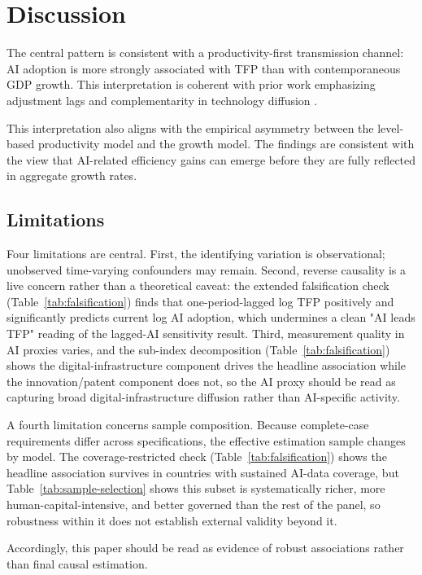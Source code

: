 \section{Discussion}

The central pattern is consistent with a productivity-first transmission channel: AI adoption is more strongly associated with TFP than with contemporaneous GDP growth. This interpretation is coherent with prior work emphasizing adjustment lags and complementarity in technology diffusion \cite{brynjolfssonRockSyverson2019}.

This interpretation also aligns with the empirical asymmetry between the level-based productivity model and the growth model. The findings are consistent with the view that AI-related efficiency gains can emerge before they are fully reflected in aggregate growth rates.

\subsection{Limitations}

Four limitations are central. First, the identifying variation is observational; unobserved time-varying confounders may remain. Second, reverse causality is a live concern rather than a theoretical caveat: the extended falsification check (Table~\ref{tab:falsification}) finds that one-period-lagged log TFP positively and significantly predicts current log AI adoption, which undermines a clean "AI leads TFP" reading of the lagged-AI sensitivity result. Third, measurement quality in AI proxies varies, and the sub-index decomposition (Table~\ref{tab:falsification}) shows the digital-infrastructure component drives the headline association while the innovation/patent component does not, so the AI proxy should be read as capturing broad digital-infrastructure diffusion rather than AI-specific activity.

A fourth limitation concerns sample composition. Because complete-case requirements differ across specifications, the effective estimation sample changes by model. The coverage-restricted check (Table~\ref{tab:falsification}) shows the headline association survives in countries with sustained AI-data coverage, but Table~\ref{tab:sample-selection} shows this subset is systematically richer, more human-capital-intensive, and better governed than the rest of the panel, so robustness within it does not establish external validity beyond it.

Accordingly, this paper should be read as evidence of robust associations rather than final causal estimation. 

